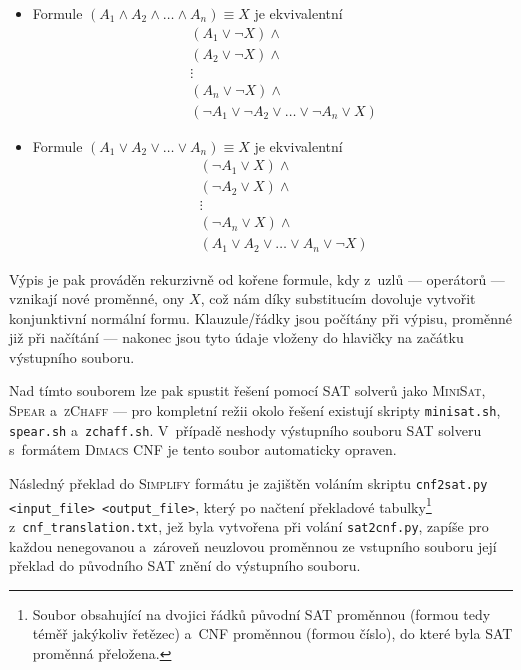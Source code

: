 \documentclass[11pt, titlepage]{report}
\begin{document}
\begin{itemize}

\item Formule $(A_{1} \wedge A_{2} \wedge \dots \wedge A_{n}) \equiv X$ je ekvivalentní 
\begin{eqnarray*}
& & (A_{1} \vee \neg X) \wedge \\
& & (A_{2} \vee \neg X) \wedge \\
& & \vdots \\
& & (A_{n} \vee \neg X) \wedge \\
& & (\neg A_{1} \vee \neg A_{2} \vee \dots \vee \neg A_{n} \vee X)
\end{eqnarray*}

\item Formule $(A_{1} \vee A_{2} \vee \dots \vee A_{n}) \equiv X$ je ekvivalentní 
\begin{eqnarray*}
& & (\neg A_{1} \vee X) \wedge \\
& & (\neg A_{2} \vee X) \wedge \\
& & \vdots \\
& & (\neg A_{n} \vee X) \wedge \\
& & (A_{1} \vee A_{2} \vee \dots \vee A_{n} \vee \neg X)
\end{eqnarray*}

\end{itemize}

Výpis je pak prováděn rekurzivně od kořene formule, kdy z~uzlů --- operátorů --- vznikají nové proměnné, ony $X$, což nám díky substitucím dovoluje vytvořit konjunktivní normální formu. Klauzule/řádky jsou počítány při výpisu, proměnné již při načítání --- nakonec jsou tyto údaje vloženy do hlavičky na začátku výstupního souboru.

Nad tímto souborem lze pak spustit řešení pomocí SAT solverů jako \textsc{MiniSat}, \textsc{Spear} a~\textsc{zChaff} --- pro kompletní režii okolo řešení existují skripty \texttt{minisat.sh}, \texttt{spear.sh} a~\texttt{zchaff.sh}. V~případě neshody výstupního souboru SAT solveru s~formátem \textsc{Dimacs CNF} je tento soubor automaticky opraven.

Následný překlad do \textsc{Simplify} formátu je zajištěn voláním skriptu \texttt{cnf2sat.py <input\_file> <output\_file>}, který po načtení překladové tabulky\footnote{Soubor obsahující na dvojici řádků původní SAT proměnnou (formou tedy téměř jakýkoliv řetězec) a~CNF proměnnou (formou číslo), do které byla SAT proměnná přeložena.} z~\texttt{cnf\_translation.txt}, jež byla vytvořena při volání \texttt{sat2cnf.py}, zapíše pro každou nenegovanou a~zároveň neuzlovou proměnnou ze vstupního souboru její překlad do původního SAT znění do výstupního souboru.
\end{document}
